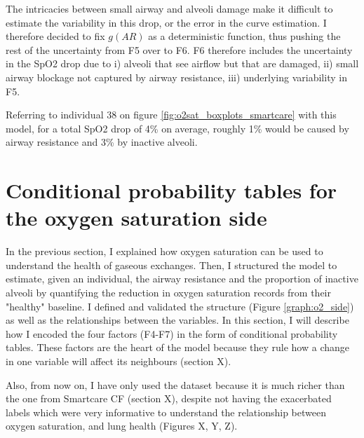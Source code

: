 The intricacies between small airway and alveoli damage make it difficult to estimate the variability in this drop, or the error in the curve estimation. I therefore decided to fix $g(AR)$ as a deterministic function, thus pushing the rest of the uncertainty from F5 over to F6. F6 therefore includes the uncertainty in the SpO2 drop due to i) alveoli that see airflow but that are damaged, ii) small airway blockage  not captured by airway resistance, iii) underlying variability in F5. 

Referring to individual 38 on figure \ref{fig:o2sat_boxplots_smartcare} with this model, for a total SpO2 drop of 4\% on average, roughly 1\% would be caused by airway resistance and 3\% by inactive alveoli.



\section{Conditional probability tables for the oxygen saturation side}
In the previous section, I explained how oxygen saturation can be used to understand the health of gaseous exchanges. Then, I structured the model to estimate, given an individual, the airway resistance and the proportion of inactive alveoli by quantifying the reduction in oxygen saturation records from their "healthy" baseline. I defined and validated the structure (Figure \ref{graph:o2_side}) as well as the relationships between the variables. In this section, I will describe how I encoded the four factors (F4-F7) in the form of conditional probability tables. These factors are the heart of the model because they rule how a change in one variable will affect its neighbours (section X). 

Also, from now on, I have only used the \BR dataset because it is much richer than the one from Smartcare CF (section X), despite not having the exacerbated labels which were very informative to understand the relationship between oxygen saturation, \F and lung health (Figures X, Y, Z).

